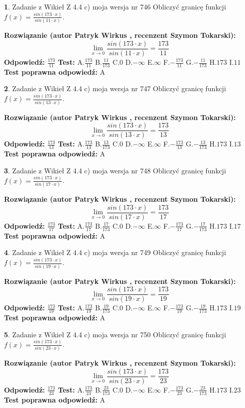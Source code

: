 \documentclass[12pt, a4paper]{article}
\theoremstyle{definition} %
\newtheorem{zad}{}
\newcommand{\zadStart}[1]{\begin{zad}#1\newline}
\newcommand{\zadStop}{\end{zad}}
\newcommand{\rozwStart}[2]{\noindent \textbf{Rozwiązanie (autor #1 , recenzent #2): }\newline}
\newcommand{\rozwStop}{\newline}
\newcommand{\odpStart}{\noindent \textbf{Odpowiedź:}\newline}
\newcommand{\odpStop}{\newline}
\newcommand{\testStart}{\noindent \textbf{Test:}\newline}
\newcommand{\testStop}{\newline}
\newcommand{\kluczStart}{\noindent \textbf{Test poprawna odpowiedź:}\newline}
\newcommand{\kluczStop}{\newline}
\begin{document}
\zadStart{Zadanie z Wikieł Z 4.4 c) moja wersja nr 746}
Obliczyć granicę funkcji $f(x)=\frac{sin(173\cdot x)}{sin(11\cdot x)}$.
\zadStop
\rozwStart{Patryk Wirkus}{Szymon Tokarski}
$$\lim\limits_{x\to 0}\frac{sin(173\cdot x)}{sin(11\cdot x)}=
\frac{173}{11}$$
\rozwStop
\odpStart
$\frac{173}{11}$
\odpStop
\testStart
A.$\frac{173}{11}$
B.$\frac{11}{173}$
C.$0$
D.$-\infty$
E.$\infty$
F.$-\frac{173}{11}$
G.$-\frac{11}{173}$
H.$173$
I.$11$
\testStop
\kluczStart
A
\kluczStop



\zadStart{Zadanie z Wikieł Z 4.4 c) moja wersja nr 747}
Obliczyć granicę funkcji $f(x)=\frac{sin(173\cdot x)}{sin(13\cdot x)}$.
\zadStop
\rozwStart{Patryk Wirkus}{Szymon Tokarski}
$$\lim\limits_{x\to 0}\frac{sin(173\cdot x)}{sin(13\cdot x)}=
\frac{173}{13}$$
\rozwStop
\odpStart
$\frac{173}{13}$
\odpStop
\testStart
A.$\frac{173}{13}$
B.$\frac{13}{173}$
C.$0$
D.$-\infty$
E.$\infty$
F.$-\frac{173}{13}$
G.$-\frac{13}{173}$
H.$173$
I.$13$
\testStop
\kluczStart
A
\kluczStop



\zadStart{Zadanie z Wikieł Z 4.4 c) moja wersja nr 748}
Obliczyć granicę funkcji $f(x)=\frac{sin(173\cdot x)}{sin(17\cdot x)}$.
\zadStop
\rozwStart{Patryk Wirkus}{Szymon Tokarski}
$$\lim\limits_{x\to 0}\frac{sin(173\cdot x)}{sin(17\cdot x)}=
\frac{173}{17}$$
\rozwStop
\odpStart
$\frac{173}{17}$
\odpStop
\testStart
A.$\frac{173}{17}$
B.$\frac{17}{173}$
C.$0$
D.$-\infty$
E.$\infty$
F.$-\frac{173}{17}$
G.$-\frac{17}{173}$
H.$173$
I.$17$
\testStop
\kluczStart
A
\kluczStop



\zadStart{Zadanie z Wikieł Z 4.4 c) moja wersja nr 749}
Obliczyć granicę funkcji $f(x)=\frac{sin(173\cdot x)}{sin(19\cdot x)}$.
\zadStop
\rozwStart{Patryk Wirkus}{Szymon Tokarski}
$$\lim\limits_{x\to 0}\frac{sin(173\cdot x)}{sin(19\cdot x)}=
\frac{173}{19}$$
\rozwStop
\odpStart
$\frac{173}{19}$
\odpStop
\testStart
A.$\frac{173}{19}$
B.$\frac{19}{173}$
C.$0$
D.$-\infty$
E.$\infty$
F.$-\frac{173}{19}$
G.$-\frac{19}{173}$
H.$173$
I.$19$
\testStop
\kluczStart
A
\kluczStop



\zadStart{Zadanie z Wikieł Z 4.4 c) moja wersja nr 750}
Obliczyć granicę funkcji $f(x)=\frac{sin(173\cdot x)}{sin(23\cdot x)}$.
\zadStop
\rozwStart{Patryk Wirkus}{Szymon Tokarski}
$$\lim\limits_{x\to 0}\frac{sin(173\cdot x)}{sin(23\cdot x)}=
\frac{173}{23}$$
\rozwStop
\odpStart
$\frac{173}{23}$
\odpStop
\testStart
A.$\frac{173}{23}$
B.$\frac{23}{173}$
C.$0$
D.$-\infty$
E.$\infty$
F.$-\frac{173}{23}$
G.$-\frac{23}{173}$
H.$173$
I.$23$
\testStop
\kluczStart
A
\kluczStop
\end{document}

